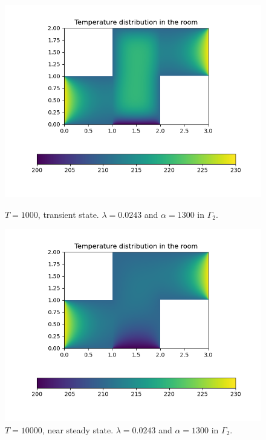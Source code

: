 \documentclass[]{article}
\begin{document}
\begin{figure}
	\includegraphics[width=\linewidth]{room_odd_params_1000}
	\caption{\label{room_odd_params_1000} $T=1000$, transient state.
	$\lambda = 0.0243$ and $\alpha = 1300$ in $\Gamma_2$.}
	\includegraphics[width=\linewidth]{room_odd_params_10000}
	\caption{\label{room_odd_params_10000} $T=10000$, near steady state. $\lambda = 0.0243$ and $\alpha = 1300$ in $\Gamma_2$.}
\end{figure}
\begin{figure}

\end{figure}




\end{document}
